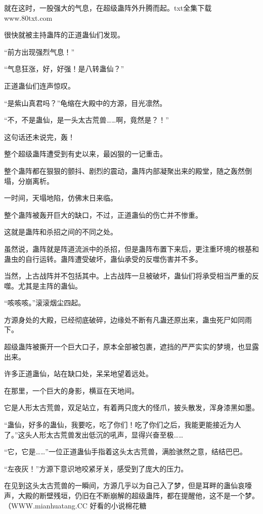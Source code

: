 
\begin{this_body}

就在这时，一股强大的气息，在超级蛊阵外升腾而起。txt全集下载www.80txt.com

很快就被主持蛊阵的正道蛊仙们发现。

“前方出现强烈气息！”

“气息狂涨，好，好强！是八转蛊仙？”

正道蛊仙们连声惊叹。

“是紫山真君吗？”龟缩在大殿中的方源，目光凛然。

“不，不是蛊仙，是一头太古荒兽……啊，竟然是？！”

这句话还未说完，轰！

整个超级蛊阵遭受到有史以来，最凶狠的一记重击。

整个蛊阵都在狠狠的颤抖、剧烈的震动，蛊阵内部凝聚出来的殿堂，随之轰然倒塌，分崩离析。

一时间，天塌地陷，仿佛末日来临。

整个蛊阵被轰开巨大的缺口，不过，正道蛊仙的伤亡并不惨重。

这就是蛊阵和杀招之间的不同之处。

虽然说，蛊阵就是阵道流派中的杀招，但是蛊阵布置下来后，更注重环境的根基和蛊虫的自行运转。蛊阵遭受破坏，蛊仙承受的反噬伤害并不多。

当然，上古战阵并不包括其中。上古战阵一旦被破坏，蛊仙们将承受相当严重的反噬。尤其是主阵的蛊仙。

“咳咳咳。”滚滚烟尘四起。

方源身处的大殿，已经彻底破碎，边缘处不断有凡蛊还原出来，蛊虫死尸如同雨下。

超级蛊阵被撕开一个巨大口子，原本全部被包裹，遮挡的严严实实的梦境，也显露出来。

许多正道蛊仙，站在缺口处，呆呆地望着远处。

在那里，一个巨大的身影，横亘在天地间。

它是人形太古荒兽，双足站立，有着两只庞大的怪爪，披头散发，浑身漆黑如墨。

“蛊仙，好多的蛊仙，我要吃，吃了你们！吃了你们之后，我能更能接近为人了。”这头人形太古荒兽发出低沉的吼声，显得兴奋至极……

“它，它是……”一位正道蛊仙手指着这头太古荒兽，满脸骇然之意，结结巴巴。

“左夜灰！”方源下意识地咬紧牙关，感受到了庞大的压力。

在见到这头太古荒兽的一瞬间，方源几乎以为自己入了梦，但是耳畔的蛊仙哀嚎声，大殿的断壁残垣，仍旧在不断崩解的超级蛊阵，都在提醒他，这不是一个梦。（WWW.mianhuatang.CC 好看的小说棉花糖


\end{this_body}
